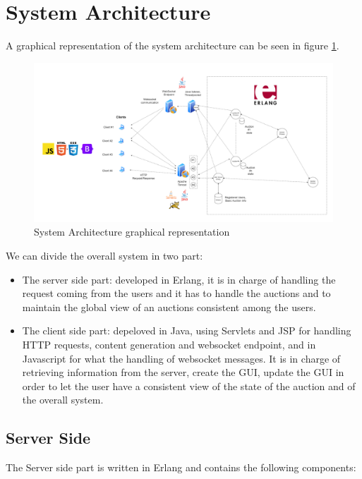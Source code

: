 \section{System Architecture}
\noindent A graphical representation of the system architecture can be seen in figure \ref{fig:architecture}.

\begin{figure}[H]
	\centering
	\includegraphics[width=1\linewidth]{img/systemStructure2.png}
	\caption{System Architecture graphical representation}
	\label{fig:architecture}
\end{figure}

\noindent We can divide the overall system in two part:
\begin{itemize}
	\item The server side part: developed in Erlang, it is in charge of handling the request coming from the users and it has to handle the auctions and to maintain the global view of an auctions consistent among the users.
	
	\item The client side part: depeloved in Java, using Servlets and JSP for handling HTTP requests, content generation and websocket endpoint, and in Javascript for what the handling of websocket messages. It is in charge of retrieving information from the server, create the GUI, update the GUI in order to let the user have a consistent view of the state of the auction and of the overall system.
\end{itemize}

\subsection{Server Side}
\noindent The Server side part is written in Erlang and contains the following components:

